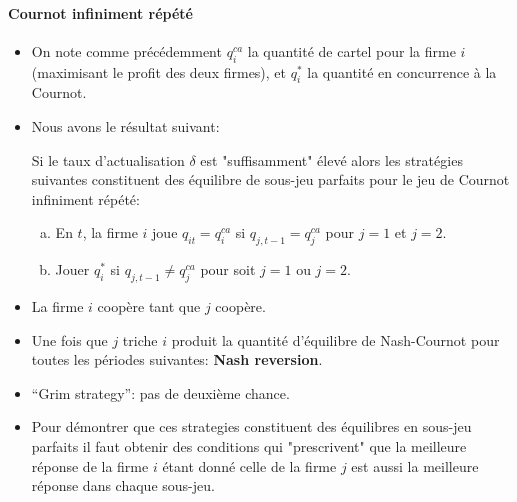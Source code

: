 \begin{frame}[allowframebreaks]{\insertsection}
\framesubtitle{Cournot infiniment répété}
\begin{itemize}
    \item On note comme précédemment $q^{ca}_i$ la quantité de cartel pour la firme $i$(maximisant le profit des deux firmes), et $q_i^*$ 
    la quantité en concurrence à la Cournot.
    \item Nous avons le résultat suivant:  
    \begin{proposition}
        Si le taux d'actualisation $\delta$ est "suffisamment"  élevé 
         alors les stratégies suivantes constituent des équilibre de sous-jeu parfaits pour  
         le jeu de Cournot infiniment répété:  
         \begin{enumerate}[(a)]
             \item En $t$, la firme $i$ joue  $q_{it} =q^{ca}_i$ si $q_{j,t-1} =q^{ca}_j$ pour $j=1$ et $j=2$. 
             \item Jouer $q^*_i$ si $q_{j,t-1} \neq q^{ca}_j$ pour soit $j=1$ ou $j=2$.
         \end{enumerate}
    \end{proposition}
    \item La firme $i$ coopère tant que $j$ coopère.
    \item Une fois que $j$ triche $i$ produit la quantité d'équilibre de Nash-Cournot 
    pour toutes les périodes suivantes: \textbf{Nash reversion}.
    \item “Grim strategy”: pas de deuxième chance.
    \item Pour démontrer que ces strategies constituent des équilibres en sous-jeu parfaits il   
    faut obtenir des conditions qui "prescrivent" que la meilleure réponse 
    de la firme $i$ étant donné celle de la firme $j$ est aussi la meilleure réponse 
    dans chaque sous-jeu.
\end{itemize}

\end{frame}

